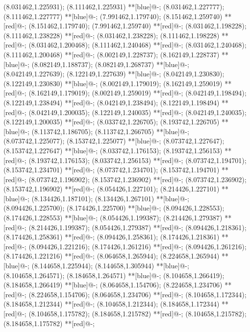 (8.031462,1.225931); (8.111462,1.225931) **[blue]@{-};
(8.031462,1.227777); (8.111462,1.227777) **[blue]@{-};
(7.991462,1.179740); (8.151462,1.259740) **[red]@{-};
(8.151462,1.179740); (7.991462,1.259740) **[red]@{-};
(8.031462,1.198228); (8.111462,1.238228) **[red]@{-};
(8.031462,1.238228); (8.111462,1.198228) **[red]@{-};
(8.031462,1.200468); (8.111462,1.240468) **[red]@{-};
(8.031462,1.240468); (8.111462,1.200468) **[red]@{-};
(8.002149,1.228737); (8.162149,1.228737) **[blue]@{-};
(8.082149,1.188737); (8.082149,1.268737) **[blue]@{-};
(8.042149,1.227639); (8.122149,1.227639) **[blue]@{-};
(8.042149,1.230830); (8.122149,1.230830) **[blue]@{-};
(8.002149,1.179019); (8.162149,1.259019) **[red]@{-};
(8.162149,1.179019); (8.002149,1.259019) **[red]@{-};
(8.042149,1.198494); (8.122149,1.238494) **[red]@{-};
(8.042149,1.238494); (8.122149,1.198494) **[red]@{-};
(8.042149,1.200035); (8.122149,1.240035) **[red]@{-};
(8.042149,1.240035); (8.122149,1.200035) **[red]@{-};
(8.033742,1.226705); (8.193742,1.226705) **[blue]@{-};
(8.113742,1.186705); (8.113742,1.266705) **[blue]@{-};
(8.073742,1.225077); (8.153742,1.225077) **[blue]@{-};
(8.073742,1.227647); (8.153742,1.227647) **[blue]@{-};
(8.033742,1.176153); (8.193742,1.256153) **[red]@{-};
(8.193742,1.176153); (8.033742,1.256153) **[red]@{-};
(8.073742,1.194701); (8.153742,1.234701) **[red]@{-};
(8.073742,1.234701); (8.153742,1.194701) **[red]@{-};
(8.073742,1.196902); (8.153742,1.236902) **[red]@{-};
(8.073742,1.236902); (8.153742,1.196902) **[red]@{-};
(8.054426,1.227101); (8.214426,1.227101) **[blue]@{-};
(8.134426,1.187101); (8.134426,1.267101) **[blue]@{-};
(8.094426,1.225700); (8.174426,1.225700) **[blue]@{-};
(8.094426,1.228553); (8.174426,1.228553) **[blue]@{-};
(8.054426,1.199387); (8.214426,1.279387) **[red]@{-};
(8.214426,1.199387); (8.054426,1.279387) **[red]@{-};
(8.094426,1.218361); (8.174426,1.258361) **[red]@{-};
(8.094426,1.258361); (8.174426,1.218361) **[red]@{-};
(8.094426,1.221216); (8.174426,1.261216) **[red]@{-};
(8.094426,1.261216); (8.174426,1.221216) **[red]@{-};
(8.064658,1.265944); (8.224658,1.265944) **[blue]@{-};
(8.144658,1.225944); (8.144658,1.305944) **[blue]@{-};
(8.104658,1.264571); (8.184658,1.264571) **[blue]@{-};
(8.104658,1.266419); (8.184658,1.266419) **[blue]@{-};
(8.064658,1.154706); (8.224658,1.234706) **[red]@{-};
(8.224658,1.154706); (8.064658,1.234706) **[red]@{-};
(8.104658,1.172344); (8.184658,1.212344) **[red]@{-};
(8.104658,1.212344); (8.184658,1.172344) **[red]@{-};
(8.104658,1.175782); (8.184658,1.215782) **[red]@{-};
(8.104658,1.215782); (8.184658,1.175782) **[red]@{-};
